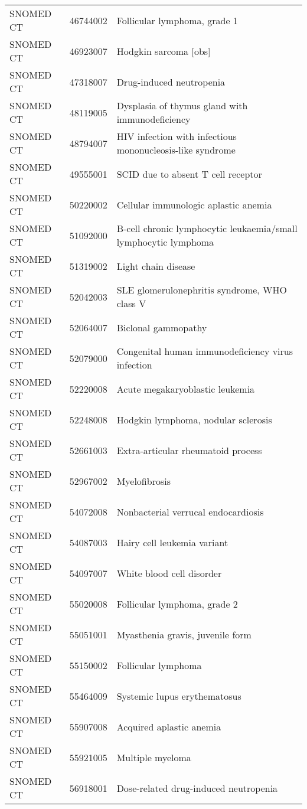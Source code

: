\begin{table}[ht]
\begin{tabular}{lll}
  SNOMED CT & 46744002 & Follicular lymphoma, grade 1 \\ 
  SNOMED CT & 46923007 & Hodgkin sarcoma [obs] \\ 
  SNOMED CT & 47318007 & Drug-induced neutropenia \\ 
  SNOMED CT & 48119005 & Dysplasia of thymus gland with immunodeficiency \\ 
  SNOMED CT & 48794007 & HIV infection with infectious mononucleosis-like syndrome \\ 
  SNOMED CT & 49555001 & SCID due to absent T cell receptor \\ 
  SNOMED CT & 50220002 & Cellular immunologic aplastic anemia \\ 
  SNOMED CT & 51092000 & B-cell chronic lymphocytic leukaemia/small lymphocytic lymphoma \\ 
  SNOMED CT & 51319002 & Light chain disease \\ 
  SNOMED CT & 52042003 & SLE glomerulonephritis syndrome, WHO class V \\ 
  SNOMED CT & 52064007 & Biclonal gammopathy \\ 
  SNOMED CT & 52079000 & Congenital human immunodeficiency virus infection \\ 
  SNOMED CT & 52220008 & Acute megakaryoblastic leukemia \\ 
  SNOMED CT & 52248008 & Hodgkin lymphoma, nodular sclerosis \\ 
  SNOMED CT & 52661003 & Extra-articular rheumatoid process \\ 
  SNOMED CT & 52967002 & Myelofibrosis \\ 
  SNOMED CT & 54072008 & Nonbacterial verrucal endocardiosis \\ 
  SNOMED CT & 54087003 & Hairy cell leukemia variant \\ 
  SNOMED CT & 54097007 & White blood cell disorder \\ 
  SNOMED CT & 55020008 & Follicular lymphoma, grade 2 \\ 
  SNOMED CT & 55051001 & Myasthenia gravis, juvenile form \\ 
  SNOMED CT & 55150002 & Follicular lymphoma \\ 
  SNOMED CT & 55464009 & Systemic lupus erythematosus \\ 
  SNOMED CT & 55907008 & Acquired aplastic anemia \\ 
  SNOMED CT & 55921005 & Multiple myeloma \\ 
  SNOMED CT & 56918001 & Dose-related drug-induced neutropenia \\ 

\end{tabular}
\end{table}
